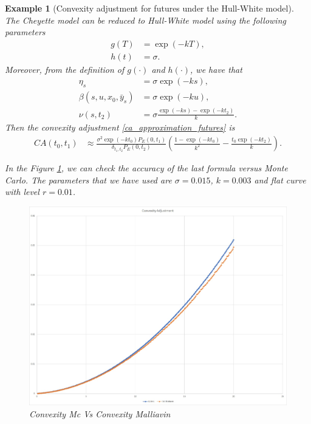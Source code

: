 \documentclass[a4paper,10pt]{article}
\newtheorem{example}[theorem]{Example}
\newcommand{\1}{\mathbf{1}}
\begin{document}
\begin{example}[Convexity adjustment for futures under the Hull-White model]\label{example_ca_future}
The Cheyette model can be reduced to Hull-White model using the following parameters
\begin{align*}
g(T) &= \exp(-kT), \\
h(t) &= \sigma.
\end{align*}
Moreover, from the definition of $g(\cdot)$ and $h(\cdot)$, we have that
\begin{align*}
\eta_s &= \sigma \exp(-ks),\\
\beta(s,u, x_0, \bar{y}_s) &= \sigma \exp(-ku),\\
\nu(s,t_2) &= \sigma \frac{\exp(-ks) - \exp(-kt_2)}{k}.
\end{align*}
Then the convexity adjustment \eqref{ca_approximation_futures} is
\begin{align*}
CA(t_0,t_1) & \approx \frac{\sigma^{2} \exp(-k t_0)  P_{E}(0,t_1)}{\delta_{t_1,t_2} P_{E}(0,t_2)} \left(\frac{1 - \exp(- k t_0)}{k^{2}} - \frac{t_0 \exp(-k t_2)}{k} \right).   
\end{align*}

In the Figure \ref{fig:Futures}, we can check the accuracy of the last formula versus Monte Carlo. The parameters that we have used are $\sigma=0.015$, $k=0.003$ and flat curve with level $r=0.01$.

\begin{figure}[H]
	\begin{center}
		\includegraphics[scale=0.3]{Figures/future_convexity.jpg}
	\end{center}
	\caption{Convexity Mc Vs Convexity Malliavin}
	\label{fig:Futures}
\end{figure} 
\end{example}
\end{document}
